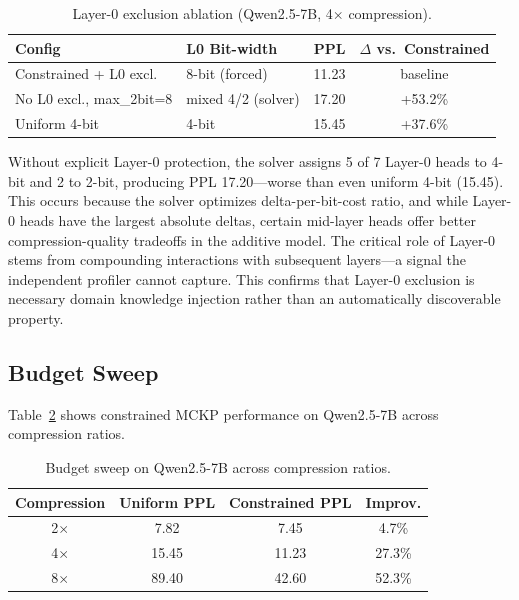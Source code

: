 \documentclass[11pt]{article}
\begin{document}
\begin{table}[h]
\centering
\caption{Layer-0 exclusion ablation (Qwen2.5-7B, 4$\times$ compression).}
\label{tab:l0}
\begin{tabular}{llcc}
\toprule
\textbf{Config} & \textbf{L0 Bit-width} & \textbf{PPL} & \textbf{$\Delta$ vs.\ Constrained} \\
\midrule
Constrained + L0 excl.    & 8-bit (forced)       & 11.23 & baseline \\
No L0 excl., max\_2bit=8  & mixed 4/2 (solver)   & 17.20 & +53.2\% \\
Uniform 4-bit              & 4-bit                & 15.45 & +37.6\% \\
\bottomrule
\end{tabular}
\end{table}

Without explicit Layer-0 protection, the solver assigns 5 of 7 Layer-0 heads to 4-bit and 2 to 2-bit, producing PPL 17.20---worse than even uniform 4-bit (15.45).
This occurs because the solver optimizes delta-per-bit-cost ratio, and while Layer-0 heads have the largest absolute deltas, certain mid-layer heads offer better compression-quality tradeoffs in the additive model.
The critical role of Layer-0 stems from compounding interactions with subsequent layers---a signal the independent profiler cannot capture.
This confirms that Layer-0 exclusion is necessary domain knowledge injection rather than an automatically discoverable property.

\subsection{Budget Sweep}
\label{sec:budget}

Table~\ref{tab:budget} shows constrained MCKP performance on Qwen2.5-7B across compression ratios.

\begin{table}[h]
\centering
\caption{Budget sweep on Qwen2.5-7B across compression ratios.}
\label{tab:budget}
\begin{tabular}{cccc}
\toprule
\textbf{Compression} & \textbf{Uniform PPL} & \textbf{Constrained PPL} & \textbf{Improv.} \\
\midrule
2$\times$ & 7.82  & 7.45  & 4.7\% \\
4$\times$ & 15.45 & 11.23 & 27.3\% \\
8$\times$ & 89.40 & 42.60 & 52.3\% \\
\bottomrule
\end{tabular}
\end{table}
\end{document}
